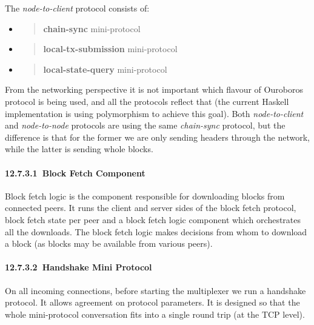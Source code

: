 \documentclass[]{article}
\let\oldparagraph\paragraph
\renewcommand{\paragraph}[1]{\oldparagraph{#1}\mbox{}}
\begin{document}
The \emph{node-to-client} protocol consists of:

\begin{itemize}
\item
  \begin{quote}
  \textbf{chain-sync} mini-protocol
  \end{quote}
\item
  \begin{quote}
  \textbf{local-tx-submission} mini-protocol
  \end{quote}
\item
  \begin{quote}
  \textbf{local-state-query} mini-protocol
  \end{quote}
\end{itemize}

From the networking perspective it is not important which flavour of
Ouroboros protocol is being used, and all the protocols reflect that
(the current Haskell implementation is using polymorphism to achieve
this goal). Both \emph{node-to-client} and \emph{node-to-node} protocols
are using the same \emph{chain-sync} protocol, but the difference is
that for the former we are only sending headers through the network,
while the latter is sending whole blocks.

\hypertarget{block-fetch-component}{%
\paragraph{​12.7.3.1​~Block Fetch
Component}\label{block-fetch-component}}

Block fetch logic is the component responsible for downloading blocks
from connected peers. It runs the client and server sides of the block
fetch protocol, block fetch state per peer and a block fetch logic
component which orchestrates all the downloads. The block fetch logic
makes decisions from whom to download a block (as blocks may be
available from various peers).

\hypertarget{handshake-mini-protocol}{%
\paragraph{​12.7.3.2​~Handshake Mini
Protocol}\label{handshake-mini-protocol}}

On all incoming connections, before starting the multiplexer we run a
handshake protocol. It allows agreement on protocol parameters. It is
designed so that the whole mini-protocol conversation fits into a single
round trip (at the TCP level).
\end{document}
